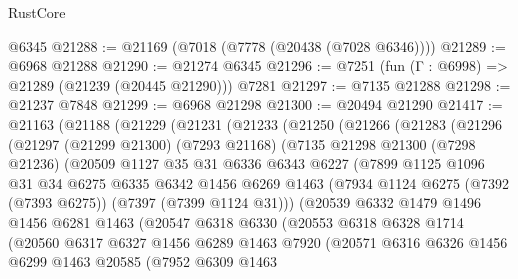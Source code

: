 \begin{lexlean}{RustCore}
\begin{coremodule}
    @6345
@21288 := @21169 (@7018 (@7778 (@20438 (@7028 @6346))))
@21289 := @6968 @21288
@21290 := @21274 @6345
@21296 := @7251 (fun (Γ : @6998) => @21289 (@21239 (@20445 @21290))) @7281
@21297 := @7135 @21288
@21298 := @21237 @7848
@21299 := @6968 @21298
@21300 := @20494 @21290
@21417 := @21163
    (@21188
      (@21229
        (@21231
          (@21233
            (@21250
              (@21266
                (@21283
                  (@21296
                    (@21297
                      (@21299 @21300)
                      (@7293 @21168)
                      (@7135
                        @21298
                        @21300
                        (@7298 @21236)
                        (@20509
                          @1127
                          @35
                          @31
                          @6336
                          @6343
                          @6227
                          (@7899
                            @1125
                            @1096
                            @31
                            @34
                            @6275
                            @6335
                            @6342
                            @1456
                            @6269
                            @1463
                            (@7934 @1124 @6275 (@7392 (@7393 @6275)) (@7397 (@7399 @1124 @31)))
                            (@20539
                              @6332
                              @1479
                              @1496
                              @1456
                              @6281
                              @1463
                              (@20547
                                @6318
                                @6330
                                (@20553
                                  @6318
                                  @6328
                                  @1714
                                  (@20560
                                    @6317
                                    @6327
                                    @1456
                                    @6289
                                    @1463
                                    @7920
                                    (@20571
                                      @6316
                                      @6326
                                      @1456
                                      @6299
                                      @1463
                                      @20585
                                      (@7952
                                        @6309
                                        @1463

\end{coremodule}
\end{lexlean}
